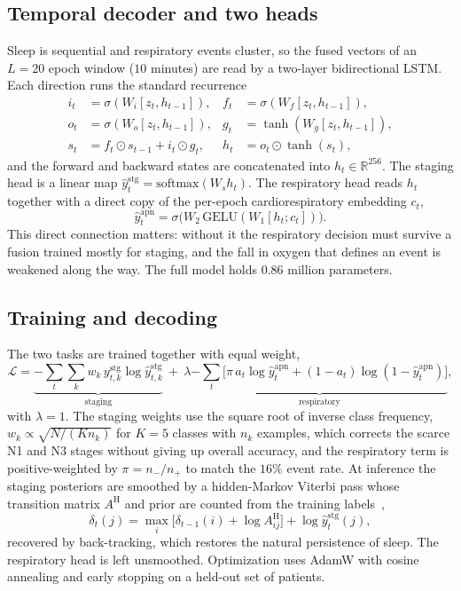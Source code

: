 \documentclass[journal]{IEEEtran}
\begin{document}
\subsection{Temporal decoder and two heads}
Sleep is sequential and respiratory events cluster, so the fused vectors of an $L=20$ epoch
window ($10$ minutes) are read by a two-layer bidirectional LSTM. Each direction runs the
standard recurrence
\begin{align}
i_t&=\sigma(W_i[z_t,h_{t-1}]), & f_t&=\sigma(W_f[z_t,h_{t-1}]),\nonumber\\
o_t&=\sigma(W_o[z_t,h_{t-1}]), & g_t&=\tanh(W_g[z_t,h_{t-1}]),\\
s_t&=f_t\odot s_{t-1}+i_t\odot g_t, & h_t&=o_t\odot\tanh(s_t),\nonumber
\end{align}
and the forward and backward states are concatenated into $h_t\in\mathbb{R}^{256}$. The
staging head is a linear map $\hat y^{\mathrm{stg}}_t=\mathrm{softmax}(W_s h_t)$. The
respiratory head reads $h_t$ together with a direct copy of the per-epoch cardiorespiratory
embedding $c_t$,
\begin{equation}
\hat y^{\mathrm{apn}}_t=\sigma\!\big(W_2\,\mathrm{GELU}(W_1[h_t;c_t])\big).
\end{equation}
This direct connection matters: without it the respiratory decision must survive a fusion
trained mostly for staging, and the fall in oxygen that defines an event is weakened along the
way. The full model holds $0.86$ million parameters.

\subsection{Training and decoding}
The two tasks are trained together with equal weight,
\begin{equation}
\mathcal{L}=\underbrace{-\sum_t\sum_{k}w_k\,y^{\mathrm{stg}}_{t,k}\log\hat y^{\mathrm{stg}}_{t,k}}_{\text{staging}}
\ +\ \lambda\underbrace{-\sum_t\big[\pi\,a_t\log\hat y^{\mathrm{apn}}_t+(1{-}a_t)\log(1{-}\hat y^{\mathrm{apn}}_t)\big]}_{\text{respiratory}},
\end{equation}
with $\lambda=1$. The staging weights use the square root of inverse class frequency,
$w_k\propto\sqrt{N/(K n_k)}$ for $K=5$ classes with $n_k$ examples, which corrects the scarce
N1 and N3 stages without giving up overall accuracy, and the respiratory term is
positive-weighted by $\pi=n_-/n_+$ to match the $16\%$ event rate. At inference the staging
posteriors are smoothed by a hidden-Markov Viterbi pass whose transition matrix $A^{\mathrm H}$
and prior are counted from the training labels~\cite{chen2024hmm},
\begin{equation}
\delta_t(j)=\max_i\big[\delta_{t-1}(i)+\log A^{\mathrm H}_{ij}\big]+\log\hat y^{\mathrm{stg}}_t(j),
\end{equation}
recovered by back-tracking, which restores the natural persistence of sleep. The respiratory
head is left unsmoothed. Optimization uses AdamW with cosine annealing and early stopping on a
held-out set of patients.
\end{document}
